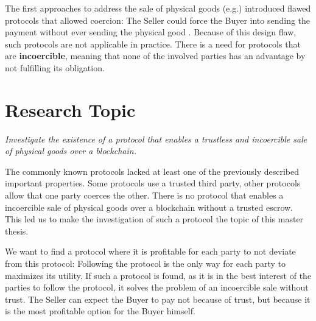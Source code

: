 \documentclass{cacthesis}
\begin{document}
	The first approaches to address the sale of physical goods (e.g.\cite{zimbeck_two_nodate}) introduced flawed protocols that allowed coercion: The Seller could force the Buyer into sending the payment without ever sending the physical good \cite{goharshady_irrationality_2021}. Because of this design flaw, such protocols are not applicable in practice. There is a need for protocols that are \textbf{incoercible}, meaning that none of the involved parties has an advantage by not fulfilling its obligation.\newline
	

	
	\section{Research Topic}

	\emph{Investigate the existence of a protocol that enables a trustless and incoercible sale of physical goods over a blockchain.}\newline
	
    The commonly known protocols lacked at least one of the previously described important properties. Some protocols use a trusted third party, other protocols allow that one party coerces the other. There is no protocol that enables a incoercible sale of physical goods over a blockchain without a trusted escrow. This led us to make the investigation of such a protocol the topic of this master thesis.\newline
    

 We want to find a protocol where it is profitable for each party to not deviate from this protocol: Following the protocol is the only way for each party to maximizes its utility.
If such a protocol is found, as it is in the best interest of the parties to follow the protocol, it solves the problem of an incoercible sale without trust. The Seller can expect the Buyer to pay not because of trust, but because it is the most profitable option for the Buyer himself. \newline 
\end{document}
